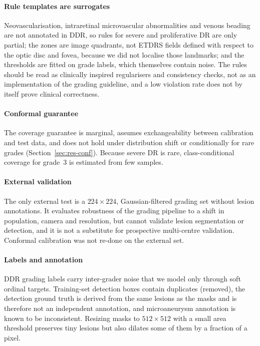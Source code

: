 \paragraph{Rule templates are surrogates} Neovascularisation, intraretinal microvascular abnormalities and venous beading are not annotated in DDR, so rules for severe and proliferative DR are only partial; the zones are image quadrants, not ETDRS fields defined with respect to the optic disc and fovea, because we did not localise those landmarks; and the thresholds are fitted on grade labels, which themselves contain noise. The rules should be read as clinically inspired regularisers and consistency checks, not as an implementation of the grading guideline, and a low violation rate does not by itself prove clinical correctness.

\paragraph{Conformal guarantee} The coverage guarantee is marginal, assumes exchangeability between calibration and test data, and does not hold under distribution shift or conditionally for rare grades (Section~\ref{sec:res-conf}). Because severe DR is rare, class-conditional coverage for grade~3 is estimated from few samples.

\paragraph{External validation} The only external test is a $224\times224$, Gaussian-filtered grading set without lesion annotations. It evaluates robustness of the grading pipeline to a shift in population, camera and resolution, but cannot validate lesion segmentation or detection, and it is not a substitute for prospective multi-centre validation. Conformal calibration was not re-done on the external set.

\paragraph{Labels and annotation} DDR grading labels carry inter-grader noise that we model only through soft ordinal targets. Training-set detection boxes contain duplicates (removed), the detection ground truth is derived from the same lesions as the masks and is therefore not an independent annotation, and microaneurysm annotation is known to be inconsistent. Resizing masks to $512\times512$ with a small area threshold preserves tiny lesions but also dilates some of them by a fraction of a pixel.

